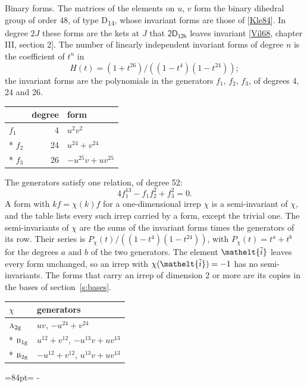 \documentclass[10pt,a4paper]{article}
\makeatletter
\renewcommand\paragraph{\@startsection{paragraph}{4}{\z@}{1.5ex plus .5ex minus .2ex}{-1em}%
  {\normalfont\small\sffamily\bfseries\color{parttitle}}}
\newcommand{\needspace}[1]{\par\penalty-100\begingroup\dimen0=#1\relax\dimen2=\pagegoal
  \advance\dimen2-\pagetotal\ifdim\dimen0>\dimen2\relax\ifdim\dimen2>0pt\vfil\break\fi\fi
  \endgroup}
\numberwithin{equation}{section}
\newcommand{\eltfont}[1]{{\let\sigma\eltsigma\mathelt{#1}}}
\newcommand{\grp}[1]{\mathsf{#1}}
\newcommand{\irr}[1]{\text{\normalfont\scshape #1}}
\newcommand{\elt}[1]{\eltfont{#1}}
\newcommand{\ptag}[1]{\mathrm{#1}}
\newcommand{\lift}[1]{\tilde{#1}}
\makeatother
\begin{document}
\paragraph{Binary forms.}
The matrices of the elements on $u$, $v$ form the binary dihedral group of order 48, of type D\textsubscript{14}, whose invariant forms are those of [\href{../../../REFERENCES.pdf\#ref.Kle84}{Kle84}]. In degree $2J$ these forms are the kets at $J$ that $\grp{2D_{12h}}$ leaves invariant [\href{../../../REFERENCES.pdf\#ref.Vil68}{Vil68}, chapter III, section 2]. \label{n:head.degree}\label{n:head.form}The number of linearly independent invariant forms of degree $n$ is the coefficient of $t^n$ in
\begin{equation}\label{e:molien}H(t) = (1 + t^{26})/((1-t^{4})(1-t^{24}));\end{equation}
the invariant forms are the polynomials in the generators $f_1$, $f_2$, $f_3$, of degrees 4, 24 and 26.
{\small\begin{longtable}{@{}lrl@{}}\toprule
& degree & form\\\midrule\endhead
\bottomrule\endfoot\endlastfoot
$f_{1}$ & 4 & $u^{2}v^{2}$\\*
$f_{2}$ & 24 & $u^{24} + v^{24}$\\*
$f_{3}$ & 26 & $-u^{25}v + uv^{25}$\\
\bottomrule\end{longtable}}
The generators satisfy one relation, of degree 52:
\begin{equation}\label{e:relation}4f_{1}^{13} - f_{1}f_{2}^{2} + f_{3}^{2} = 0.\end{equation}
A form with $k f = \chi(k) f$ for a one-dimensional irrep $\chi$ is a semi-invariant of $\chi$, and the table lists every such irrep carried by a form, except the trivial one. \label{n:head.generators}The semi-invariants of $\chi$ are the sums of the invariant forms times the generators of its row. Their series is $P_\chi(t)/((1-t^{4})(1-t^{24}))$, with $P_\chi(t) = t^{a} + t^{b}$ for the degrees $a$ and $b$ of the two generators. The element $\elt{\lift{i}}$ leaves every form unchanged, so an irrep with $\chi(\elt{\lift{i}}) = -1$ has no semi-invariants. The forms that carry an irrep of dimension 2 or more are its copies in the bases of section~\ref{s:bases}.
{\small\begin{longtable}{@{}ll@{}}\toprule
$\chi$ & generators\\\midrule\endhead
\bottomrule\endfoot\endlastfoot
$\irr{a}_{2\ptag{g}}$ & $uv$, $-u^{24} + v^{24}$\\*
$\irr{b}_{1\ptag{g}}$ & $u^{12} + v^{12}$, $-u^{13}v + uv^{13}$\\*
$\irr{b}_{2\ptag{g}}$ & $-u^{12} + v^{12}$, $u^{13}v + uv^{13}$\\
\bottomrule\end{longtable}}
\needspace{84pt}
\end{document}
